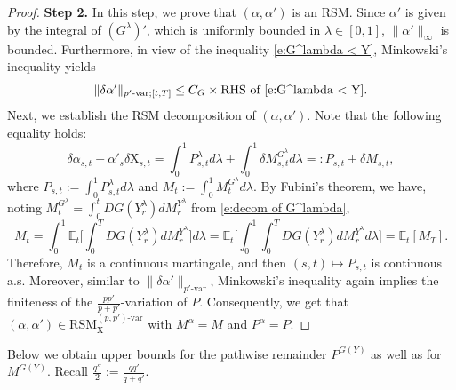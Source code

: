 \documentclass[11pt,reqno]{amsart}
\numberwithin{equation}{section}
\def\E{\mathbb E}
\begin{document}
\begin{proof}
{\textbf{Step 2.}} In this step, we prove that $(\alpha,\alpha')$ is an RSM. 
Since $\alpha'$ is given by  the integral of $(G^{\lambda})'$, which is uniformly bounded in $\lambda\in[0,1]$, 
$\|\alpha'\|_{\infty}$ is bounded.
Furthermore, in view of the inequality \eqref{e:G^lambda < Y}, Minkowski's inequality yields  
\begin{equation*} \|\delta \alpha'\|_{p'\text{-}\mathrm{var};[t,T]} 
\le C_G \times \text{RHS of \eqref{e:G^lambda < Y}}.
\end{equation*}
Next, we establish the \textrm{RSM} decomposition of $(\alpha,\alpha')$. Note that the following equality holds:
\begin{equation*}
\delta \alpha_{s,t} - \alpha'_{s} \delta \mathrm X_{s,t} = \int_{0}^{1} P^{\lambda}_{s,t}  d\lambda + \int_{0}^{1} \delta M^{G^{\lambda}}_{s,t} d\lambda =: P_{s,t} + \delta M_{s,t}, 
\end{equation*}
where $P_{s,t} := \int_{0}^{1} P^{\lambda}_{s,t}  d\lambda$ and $M_{t} := \int_{0}^{1} M^{G^{\lambda}}_{t} d\lambda$. By Fubini's theorem, we have, noting $M^{G^{\lambda}}_t = \int_{0}^{t} DG(Y^{\lambda}_r)dM^{Y^{\lambda}}_r$ from \eqref{e:decom of G^lambda}, 
\begin{equation*}
M_{t} = \int_{0}^{1} \E_{t}\Big[\int_{0}^{T} DG(Y^{\lambda}_r)dM^{Y^{\lambda}}_r \Big] d\lambda = \E_{t}\Big[\int_{0}^{1}\int_{0}^{T}  DG(Y^{\lambda}_r)dM^{Y^{\lambda}}_r d\lambda \Big] = \E_{t}[M_T]. 
\end{equation*}
Therefore, $M_t$ is a continuous martingale, and then $(s,t)\mapsto P_{s,t}$ is continuous a.s. Moreover, similar to $\|\delta \alpha'\|_{p'\text{-}\mathrm{var}}$, Minkowski's inequality again implies the finiteness of the $\frac{pp'}{p+p'}$-variation of $P$. Consequently, we get that $(\alpha,\alpha')\in \mathrm{RSM}^{(p,p')\text{-}\mathrm{var}}_{\mathrm X}$ with $M^{\alpha} = M$ and $P^{\alpha} = P$.  
\end{proof}


Below we obtain  upper bounds for the pathwise remainder $P^{G(Y)}$ as well as for $M^{G(Y)}$. Recall $\frac{q''}{2} := \frac{qq'}{q+q'}$.
\end{document}

